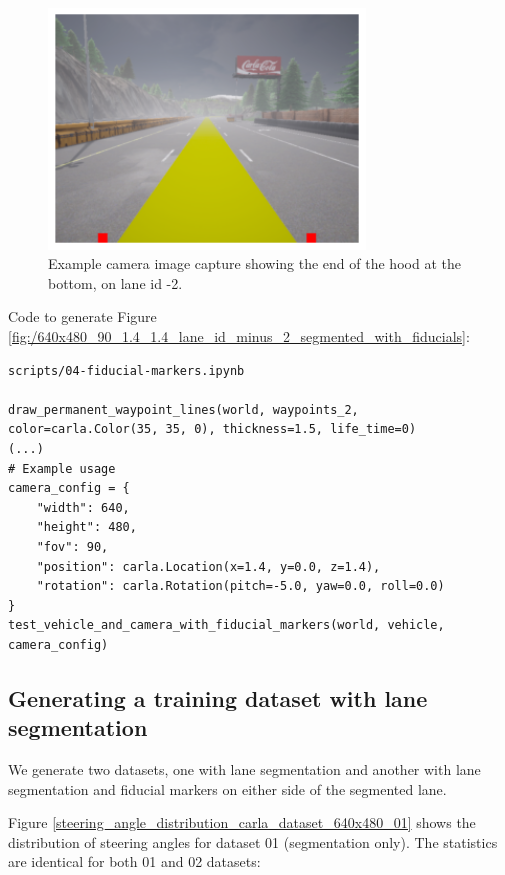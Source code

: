 
\begin{figure}[h]
    \centering
    \includegraphics[width=0.75\textwidth]{Figures/Methods/640x480_90_1.4_1.4_lane_id_minus_2_segmented_with_fiducials.png}
    \caption{Example camera image capture showing the end of the hood at the bottom, on lane id -2.}
    \label{fig:/640x480_90_1.4_1.4_lane_id_minus_2_segmented}
\end{figure}

Code to generate Figure \ref{fig:/640x480_90_1.4_1.4_lane_id_minus_2_segmented_with_fiducials}:

\begin{verbatim}
scripts/04-fiducial-markers.ipynb

draw_permanent_waypoint_lines(world, waypoints_2, color=carla.Color(35, 35, 0), thickness=1.5, life_time=0)
(...)
# Example usage
camera_config = {
    "width": 640,
    "height": 480,
    "fov": 90,
    "position": carla.Location(x=1.4, y=0.0, z=1.4),
    "rotation": carla.Rotation(pitch=-5.0, yaw=0.0, roll=0.0)
}
test_vehicle_and_camera_with_fiducial_markers(world, vehicle, camera_config)
\end{verbatim}

\subsection{Generating a training dataset with lane segmentation}

We generate two datasets, one with lane segmentation and another with lane segmentation and fiducial markers on either side of the segmented lane.

Figure \ref{steering_angle_distribution_carla_dataset_640x480_01} shows the distribution of steering angles for dataset 01 (segmentation only). The statistics are identical for both 01 and 02 datasets:

